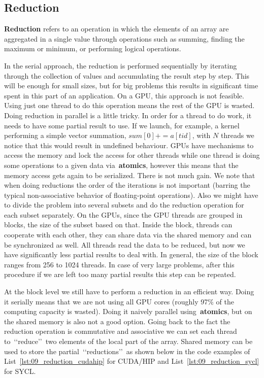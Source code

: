 

\subsection{Reduction}


\par
\textbf{Reduction} refers to an operation in which the elements of an array are aggregated in a single value through operations such as summing, finding the maximum or minimum, or performing logical operations.


\par
In the serial approach, the reduction is performed sequentially by iterating through the collection of values and accumulating the result step by step.
This will be enough for small sizes, but for big problems this results in significant time spent in this part of an application.
On a GPU, this approach is not feasible. Using just one thread to do this operation means the rest of the GPU is wasted.
Doing reduction in parallel is a little tricky.
In order for a thread to do work, it needs to have some partial result to use.
If we launch, for example, a kernel performing a simple vector summation, $sum[0] += a[tid]$, with $N$ threads we notice that this would result in undefined behaviour.
GPUs have mechanisms to access the memory and lock the access for other threads while one thread is doing some operations to a given data via~\textbf{atomics}, however this means that the memory access gets again to be serialized.
There is not much gain.
We note that when doing reductions the order of the iterations is not important (barring the typical non-associative behavior of floating-point operations).
Also we might have to divide the problem into several subsets and do the reduction operation for each subset separately.
On the GPUs, since the GPU threads are grouped in blocks, the size of the subset based on that.
Inside the block, threads can cooperate with each other, they can share data via the shared memory and can be synchronized as well.
All threads read the data to be reduced, but now we have significantly less partial results to deal with.
In general, the size of the block ranges from 256 to 1024 threads.
In case of very large problems, after this procedure if we are left too many partial results this step can be repeated.


\par
At the block level we still have to perform a reduction in an efficient way.
Doing it serially means that we are not using all GPU cores (roughly 97\% of the computing capacity is wasted). 
Doing it naively parallel using~\textbf{atomics}, but on the shared memory is also not a good option.
Going back to the fact the reduction operation is commutative and associative we can set each thread to~\lq\lq reduce\rq\rq~two elements of the local part of the array.
Shared memory can be used to store the partial~\lq\lq reductions\rq\rq~as shown below in the code examples of List~\ref{lst:09_reduction_cudahip} for CUDA/HIP and List~\ref{lst:09_reduction_sycl} for SYCL.


